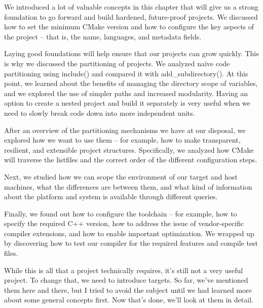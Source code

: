 We introduced a lot of valuable concepts in this chapter that will give us a strong foundation to go forward and build hardened, future-proof projects. We discussed how to set the minimum CMake version and how to configure the key aspects of the project – that is, the name, languages, and metadata fields.

Laying good foundations will help ensure that our projects can grow quickly. This is why we discussed the partitioning of projects. We analyzed naïve code partitioning using include() and compared it with add\_subdirectory(). At this point, we learned about the benefits of managing the directory scope of variables, and we explored the use of simpler paths and increased modularity. Having an option to create a nested project and build it separately is very useful when we need to slowly break code down into more independent units.

After an overview of the partitioning mechanisms we have at our disposal, we explored how we want to use them – for example, how to make transparent, resilient, and extensible project structures. Specifically, we analyzed how CMake will traverse the listfiles and the correct order of the different configuration steps.

Next, we studied how we can scope the environment of our target and host machines, what the differences are between them, and what kind of information about the platform and system is available through different queries.

Finally, we found out how to configure the toolchain – for example, how to specify the required C++ version, how to address the issue of vendor-specific compiler extensions, and how to enable important optimization. We wrapped up by discovering how to test our compiler for the required features and compile test files.

While this is all that a project technically requires, it's still not a very useful project. To change that, we need to introduce targets. So far, we've mentioned them here and there, but I tried to avoid the subject until we had learned more about some general concepts first. Now that's done, we'll look at them in detail.